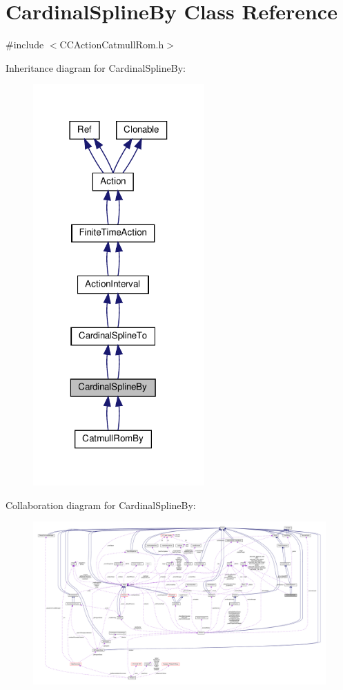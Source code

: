 \hypertarget{classCardinalSplineBy}{}\section{Cardinal\+Spline\+By Class Reference}
\label{classCardinalSplineBy}


{\ttfamily \#include $<$C\+C\+Action\+Catmull\+Rom.\+h$>$}



Inheritance diagram for Cardinal\+Spline\+By\+:
\nopagebreak
\begin{figure}[H]
\begin{center}
\leavevmode
\includegraphics[width=186pt]{classCardinalSplineBy__inherit__graph}
\end{center}
\end{figure}


Collaboration diagram for Cardinal\+Spline\+By\+:
\nopagebreak
\begin{figure}[H]
\begin{center}
\leavevmode
\includegraphics[width=350pt]{classCardinalSplineBy__coll__graph}
\end{center}
\end{figure}
